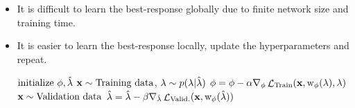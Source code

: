 \documentclass[landscape,a0b,final,a4resizeable]{include/a0poster}
\begin{document}
\begin{poster}
\begin{multicols}{3}
\begin{itemize}
	\item It is difficult to learn the best-response globally due to finite network size and training time.
	\item It is easier to learn the best-response locally, update the hyperparameters and repeat.
	\\
	\begin{algorithmic}[1]
	\State $\textrm{initialize } \phi, \smash{\hat{\lambda}}$
		\State $\bf{x} \sim \textnormal{Training data}$, $\lambda \sim p ( \lambda | \smash{\hat{\lambda}} )$
		\State $\phi = \phi - \alpha \nabla_{\phi} \mathop{\mathcal{L}}_{\mathrm{Train}} ( \bf{x}, \mathrm{w}_{\phi} ( \lambda ), \lambda )$ 
		\State $\bf{x} \sim \textnormal{Validation data}$
		\State $\smash{\hat{\lambda}} = \smash{\hat{\lambda}} - \beta \nabla_{\smash{\hat{\lambda}}} \mathop{\mathcal{L}}_{\mathrm{Valid.}} ( \bf{x}, \mathrm{w}_{\phi} ( \smash{\hat{\lambda}} ))$
	\EndFor \\
	\Return{$\curRename{\hyper}, \approxResponse{\curRename{\hyper}}{\responseParam}$}
	\end{algorithmic}
\end{itemize}
\vphantom{A}

\newcommand{\hyperDimMedium}{10} %


\end{multicols}
\end{poster}
\end{document}
